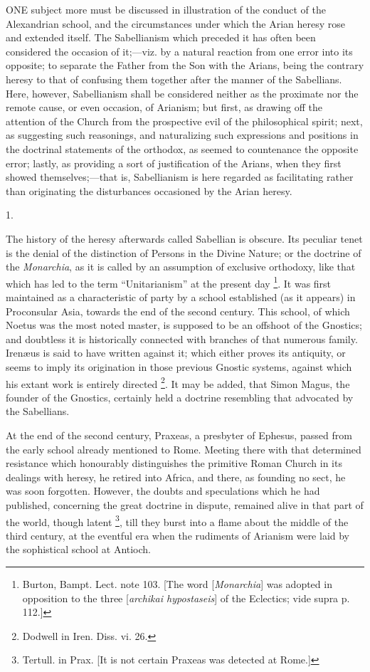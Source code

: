 ONE subject more must be discussed in
illustration of the conduct of the Alexandrian school, and the
circumstances under which the Arian heresy rose and extended itself.
The Sabellianism which preceded it has often been considered the
occasion of it;—viz. by a natural reaction from one error into its
opposite; to separate the Father from the Son with the Arians, being
the contrary heresy to that of confusing them together after the
manner of the Sabellians. Here, however, Sabellianism shall be
considered neither as the proximate nor the remote cause, or even
occasion, of Arianism; but first, as drawing off the attention of the
Church from the prospective evil of the philosophical spirit; next, as
suggesting such reasonings, and naturalizing such expressions and
positions in the doctrinal statements of the orthodox, as seemed to
countenance the opposite error; lastly, as providing a sort of
justification of the Arians, when they first showed themselves;—that
is, Sabellianism is here regarded as facilitating rather than
originating the disturbances occasioned by the Arian heresy.

1.

The history of the heresy afterwards called Sabellian is
obscure. Its peculiar tenet is the denial of the distinction of
Persons in the Divine Nature; or the doctrine of the \emph{Monarchia},
as it is called by an assumption of exclusive orthodoxy, like that
which has led to the term ``Unitarianism'' at the present day
\footnote{Burton, Bampt. Lect. note 103. [The word [\emph{Monarchia}] was
adopted in opposition to the three [\emph{archikai hypostaseis}] of
the Eclectics; vide supra p. 112.]}. It was first maintained
as a characteristic of party by a school established (as it appears)
in Proconsular Asia, towards the end of the second century. This
school, of which Noetus was the most noted master, is supposed to be
an offshoot of the Gnostics; and doubtless it is historically
connected with branches of that numerous family. Irenæus is said to
have written against it; which either proves its antiquity, or seems
to imply its origination in those previous Gnostic systems, against
which his extant work is entirely directed \footnote{Dodwell in Iren. Diss. vi. 26.}. It may be added, that Simon Magus, the founder of the
Gnostics, certainly held a doctrine resembling that advocated by the
Sabellians.

At the end of the second century, Praxeas, a presbyter of Ephesus,
passed from the early school already mentioned to Rome. Meeting there
with that determined resistance which honourably distinguishes the
primitive Roman Church in its dealings with heresy, he retired into
Africa, and there, as founding no sect, he was soon forgotten.
However, the doubts and speculations which he had published,
concerning the great doctrine in dispute, remained alive in that part
of the world, though latent \footnote{Tertull. in Prax. [It is not certain Praxeas
was detected at Rome.]},
till they burst into a flame about the middle of the third
century, at the eventful era when the rudiments of Arianism were laid
by the sophistical school at Antioch.

